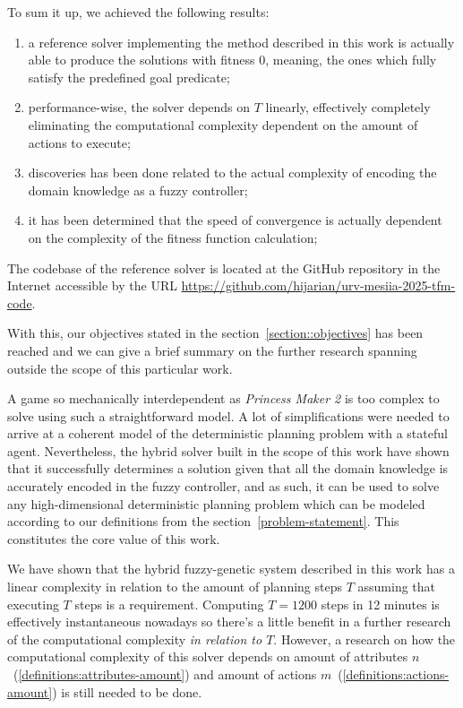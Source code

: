 \documentclass[12pt, a4paper]{report}
\begin{document}

	To sum it up, we achieved the following results:
	
	\begin{enumerate}
		\item a reference solver implementing the method described in this work is actually able to produce the solutions with fitness 0, meaning, the ones which fully satisfy the predefined goal predicate;
		\item performance-wise, the solver depends on $T$ linearly, effectively completely eliminating the computational complexity dependent on the amount of actions to execute;
		\item discoveries has been done related to the actual complexity of encoding the domain knowledge as a fuzzy controller;
		\item it has been determined that the speed of convergence is actually dependent on the complexity of the fitness function calculation;
	\end{enumerate}
	
	The codebase of the reference solver is located at the GitHub repository in the Internet accessible by the URL \url{https://github.com/hijarian/urv-mesiia-2025-tfm-code}.
	
	With this, our objectives stated in the section~\ref{section::objectives} has been reached and we can give a brief summary on the further research spanning outside the scope of this particular work.
	
	A game so mechanically interdependent as \textit{Princess Maker 2} is too complex to solve using such a straightforward model.
	A lot of simplifications were needed to arrive at a coherent model of the deterministic planning problem with a stateful agent.
	Nevertheless, the hybrid solver built in the scope of this work have shown that it successfully determines a solution given that all the domain knowledge is accurately encoded in the fuzzy controller, and as such, it can be used to solve any high-dimensional deterministic planning problem which can be modeled according to our definitions from the section~\ref{problem-statement}.
	This constitutes the core value of this work.
	
	We have shown that the hybrid fuzzy-genetic system described in this work has a linear complexity in relation to the amount of planning steps $T$ assuming that executing $T$ steps is a requirement.
	Computing $T=1200$ steps in 12 minutes is effectively instantaneous nowadays so there's a little benefit in a further research of the computational complexity \textit{in relation to $T$}.
	However, a research on how the computational complexity of this solver depends on amount of attributes $n$~(\ref{definitions:attributes-amount}) and amount of actions $m$~(\ref{definitions:actions-amount}) is still needed to be done.
\end{document}
